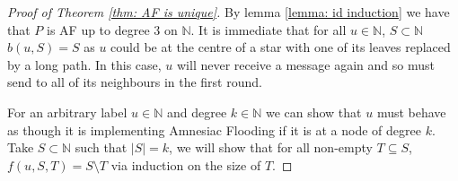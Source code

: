 \begin{proof}[Proof of Theorem \ref{thm: AF is unique}]
    By lemma \ref{lemma: id induction} we have that $P$ is AF up to degree $3$ on $\mathbb{N}$.
    It is immediate that for all $u \in \mathbb{N}$, $S \subset \mathbb{N}$ $b(u,S)=S$ as $u$ could be at the centre of a star with one of its leaves replaced by a long path.
    In this case, $u$ will never receive a message again and so must send to all of its neighbours in the first round.

    
    For an arbitrary label $u \in \mathbb{N}$ and degree $k\in \mathbb{N}$ we can show that $u$ must behave as though it is implementing Amnesiac Flooding if it is at a node of degree $k$.
    Take $S \subset \mathbb{N}$ such that $|S|=k$, we will show that for all non-empty $T\subseteq S$, $f(u,S,T)=S \setminus T$ via induction on the size of $T$.


\end{proof}

